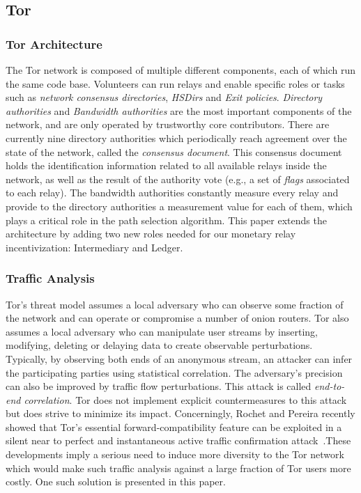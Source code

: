 \subsection{Tor}

\subsubsection{Tor Architecture}
The Tor network is composed of multiple different components, each of which run
the same code base. Volunteers can run relays and enable specific roles or tasks
such as \textit{network consensus directories}, \textit{HSDirs} and \textit{Exit
  policies}. \textit{Directory authorities} and \textit{Bandwidth authorities}
are the most important components of the network, and are only operated by
trustworthy core contributors. There are currently nine directory authorities
which periodically reach agreement over the state of the network, called the
\textit{consensus document}. This consensus document holds the identification
information related to all available relays inside the network, as well as the
result of the authority vote (e.g., a set of \textit{flags} associated to each
relay). The bandwidth authorities constantly measure every relay and provide to
the directory authorities a measurement value for each of them, which plays a
critical role in the path selection algorithm. This paper extends the
architecture by adding two new roles needed for our monetary relay
incentivization: Intermediary and Ledger.

\subsubsection{Traffic Analysis}
Tor's threat model assumes a local adversary who can observe some fraction of
the network and can operate or compromise a number of onion routers. Tor also
assumes a local adversary who can manipulate user streams by inserting,
modifying, deleting or delaying data to create observable
perturbations. Typically, by observing both ends of an anonymous stream, an
attacker can infer the participating parties using statistical correlation. The
adversary's precision can also be improved by traffic flow perturbations. This
attack is called \textit{end-to-end correlation}. Tor does not implement
explicit countermeasures to this attack but does strive to minimize its
impact. Concerningly, Rochet and Pereira recently showed that Tor's essential
forward-compatibility feature can be exploited in a silent near to perfect and
instantaneous active traffic confirmation attack~\cite{rochet2018dropping}.These
developments imply a serious need to induce more diversity to the Tor network
which would make such traffic analysis against a large fraction of Tor users
more costly. One such solution is presented in this paper.

